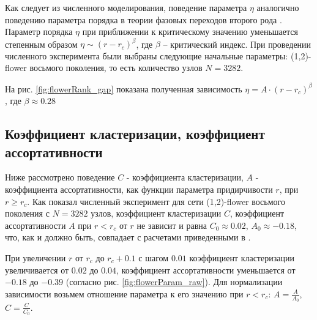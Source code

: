 \documentclass[10pt,aps,pra]{revtex4-1}
\begin{document}
        Как следует из численного моделирования, поведение параметра $\eta$ аналогично поведению параметра порядка в теории фазовых переходов второго рода \cite{Landau}. Параметр порядка $\eta$ при приближении к критическому значению уменьшается степенным образом $\eta \sim (r-r_c)^\beta$, где $\beta$ – критический индекс. 
        При проведении численного эксперимента были выбраны следующие начальные параметры: (1,2)-flower восьмого поколения, то есть количество узлов $N=3282$.

        На рис. \ref{fig:flowerRank_gap} показана полученная зависимость $\eta = A \cdot {(r-r_c)}^\beta$, где $\beta \approx 0.28$

    \subsection{Коэффициент кластеризации, коэффициент ассортативности}

        Ниже рассмотрено поведение $C$ - коэффициента кластеризации, $A$ - коэффициента ассортативности, как функции параметра придирчивости $r$, при $r \geq r_c$. Как показал численный эксперимент для сети (1,2)-flower восьмого поколения с $N=3282$ узлов, коэффициент кластеризации $C$, коэффициент ассортативности $A$ при $r<r_c$ от $r$ не зависит и равна $C_0 \approx 0.02$, $A_0 \approx -0.18$, что, как и должно быть, совпадает с расчетами приведенными в \cite{Rozenfeld1,Rozenfeld2}. 

        При увеличении $r$ от $r_c$ до $r_c + 0.1$ с шагом $0.01$ коэффициент кластеризации увеличивается от $0.02$ до $0.04$, коэффициент ассортативности уменьшается от $-0.18$ до $-0.39$ (согласно рис. \ref{fig:flowerParam_raw}). Для нормализации зависимости возьмем отношение параметра к его значению при $r<r_c$: $A=\frac{A}{A_0}$, $C=\frac{C}{C_0}$.
\end{document}
